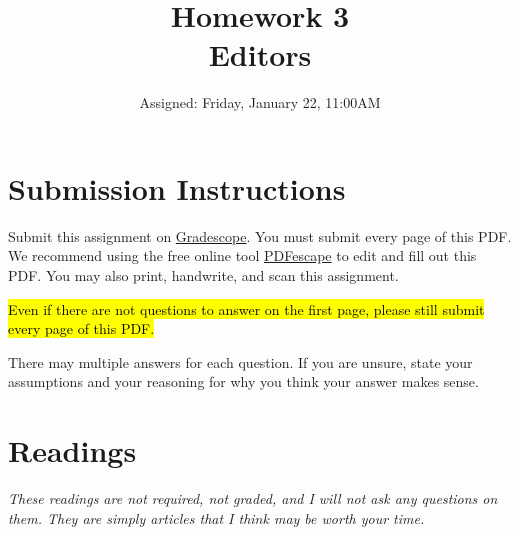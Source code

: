 \documentclass{article}
\begin{document}
\fancyfoot[C]{\color{gray} \thepage~/~\pageref*{LastPage}}
\pagestyle{fancyplain}


\title{\textbf{Homework 3\\Editors}}
\author{Assigned: Friday, January 22, 11:00AM}
\date{\textbf{\color{red}{Due: Friday, January 29, 11:00AM (Hard Deadline)}}}
\maketitle


\section*{Submission Instructions}
Submit this assignment on \href{https://gradescope.com/courses/2248}{Gradescope}.
You must submit every page of this PDF.
We recommend using the free online tool \href{https://www.pdfescape.com}{PDFescape}
to edit and fill out this PDF.
You may also print, handwrite, and scan this assignment.

\medskip
\noindent
\hl{Even if there are not questions to answer on the first page, please still
submit every page of this PDF.}

\medskip
\noindent
There may multiple answers for each question. If you are unsure,
state your assumptions and your reasoning for why you think your answer
makes sense.

\section*{Readings}
\emph{These readings are not required, not graded, and I will not ask any
questions on them. They are simply articles that I think may be worth your time.}
\end{document}
